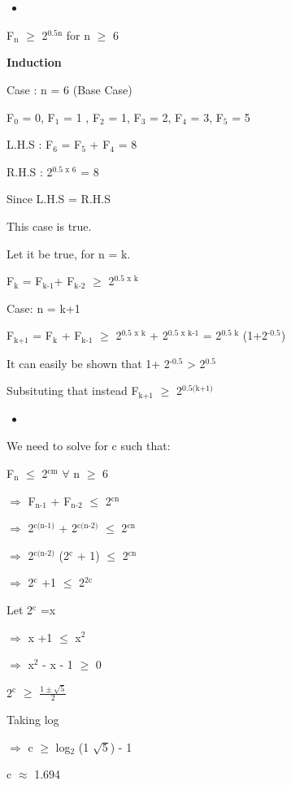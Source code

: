 \documentclass{book}
\begin{document}
\section{}
\label{sec:orge1c73ef}
\begin{itemize}
\item 
\end{itemize}
\begin{EQUATION}
F\(_{\text{n}}\) \(\ge\) 2\(^{\text{0.5n}}\) for n \(\ge\) 6

\textbf{Induction}

Case : n = 6 (Base Case)

F\(_{\text{0}}\) = 0, F\(_{\text{1}}\) = 1 , F\(_{\text{2}}\) = 1, F\(_{\text{3}}\) = 2, F\(_{\text{4}}\) = 3, F\(_{\text{5}}\) = 5

L.H.S : F\(_{\text{6}}\) = F\(_{\text{5}}\) + F\(_{\text{4}}\) = 8

R.H.S : 2\(^{\text{0.5 x 6}}\) = 8

Since L.H.S = R.H.S

This case is true.

Let it be true, for n = k.

F\(_{\text{k}}\) = F\(_{\text{k-1}}\)+ F\(_{\text{k-2}}\) \(\ge\) 2\(^{\text{0.5 x k}}\)

Case: n = k+1

F\(_{\text{k+1}}\) = F\(_{\text{k}}\) + F\(_{\text{k-1}}\) \(\ge\) 2\(^{\text{0.5 x k}}\) + 2\(^{\text{0.5 x k-1}}\)  = 2\(^{\text{0.5 k}}\) (1+2\(^{\text{-0.5}}\)) 

It can easily be shown that 1+ 2\(^{\text{-0.5}}\) > 2\(^{\text{0.5}}\)

Subsituting that instead
F\(_{\text{k+1}}\) \(\ge\) 2\(^{\text{0.5(k+1)}}\)
\end{EQUATION}
\begin{itemize}
\item 
\end{itemize}
\begin{EQUATION}
We need to solve for c such that:

F\(_{\text{n}}\) \(\le\) 2\(^{\text{cm}}\) \(\forall\) n \(\ge\) 6

\(\Rightarrow\) F\(_{\text{n-1}}\) + F\(_{\text{n-2}}\) \(\le\) 2\(^{\text{cn}}\)

\(\Rightarrow\) 2\(^{\text{c(n-1)}}\) + 2\(^{\text{c(n-2)}}\) \(\le\) 2\(^{\text{cn}}\)

\(\Rightarrow\) 2\(^{\text{c(n-2)}}\) (2\(^{\text{c}}\) + 1) \(\le\) 2\(^{\text{cn}}\)

\(\Rightarrow\) 2\(^{\text{c}}\) +1  \(\le\) 2\(^{\text{2c}}\)

Let 2\(^{\text{c}}\) =x

\(\Rightarrow\) x +1 \(\le\) x\(^{\text{2}}\)

\(\Rightarrow\) x\(^{\text{2}}\) - x - 1 \(\ge\) 0

2\(^{\text{c}}\) \(\ge\) \(\frac{1 \pm \sqrt{5}}{2}\) 

Taking log

\(\Rightarrow\) c  \(\ge\) log\(_{\text{2}}\) (1 \textpm{} \(\sqrt{5}\)) - 1

c \(\approx\) 1.694
\end{EQUATION}
\end{document}
